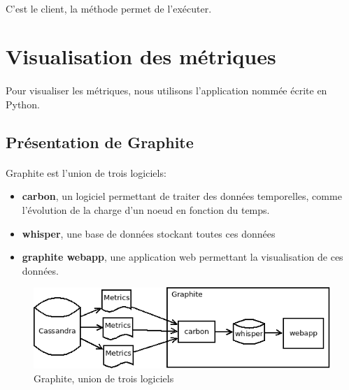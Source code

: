 \documentclass[12pt]{article}
\begin{document}
\paragraph{} C'est le client, la méthode  permet de l'exécuter.



\newpage


\section{Visualisation des métriques}

\paragraph{} Pour visualiser les métriques, nous utilisons l'application nommée  écrite en Python.

\subsection{Présentation de Graphite}

\paragraph{} Graphite est l'union de trois logiciels:
\begin{itemize}
 \item \textbf{carbon}, un logiciel permettant de traiter des données temporelles, comme l'évolution de la charge d'un noeud en fonction du temps.
 \item \textbf{whisper}, une base de données stockant toutes ces données
 \item \textbf{graphite webapp}, une application web permettant la visualisation de ces données.
\end{itemize}

\vspace{0.5cm} %

\begin{figure}[H]
	\centering
		\includegraphics[width=12cm]{schemas/graphite.png}
	\caption{Graphite, union de trois logiciels}
\end{figure}
\end{document}
